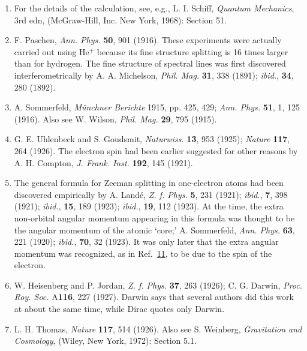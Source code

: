 \begin{enumerate}
\item\label{ref:1.9} For the details of the calculation, see, e.g., L. I. Schiff,
\emph{Quantum Mechanics}, 3rd edn, (McGraw-Hill, Inc. New York, 1968): Section
51.

\item\label{ref:1.10} F. Paschen, \emph{Ann. Phys.} \textbf{50}, 901 (1916). These
experiments were actually carried out using He$^+$ because its fine structure
splitting is 16 times larger than for hydrogen. The fine structure of spectral
lines was first discovered interferometrically by A. A. Michelson, \emph{Phil.
Mag.} \textbf{31}, 338 (1891); \emph{ibid.}, \textbf{34}, 280 (1892).

\item[10a.]\label{ref:1.10a}\label{ref:1.10c} A. Sommerfeld, \emph{M\"unchner Berichte} 1915, pp. 425, 429;
\emph{Ann. Phys.} \textbf{51}, 1, 125 (1916). Also see W. Wilson, \emph{Phil.
Mag.} \textbf{29}, 795 (1915).

\item\label{ref:1.11} G. E. Uhlenbeck and S. Goudsmit, \emph{Naturwiss.} \textbf{13}, 953
(1925); \emph{Nature} \textbf{117}, 264 (1926). The electron spin had been
earlier suggested for other reasons by A. H. Compton, \emph{J. Frank. Inst.}
\textbf{192}, 145 (1921).

\item\label{ref:1.12} The general formula for Zeeman splitting in one-electron atoms had been
discovered empirically by A. Land\'e, \emph{Z. f. Phys.} \textbf{5}, 231
(1921); \emph{ibid.}, \textbf{7}, 398 (1921); \emph{ibid.}, \textbf{15}, 189
(1923); \emph{ibid.}, \textbf{19}, 112 (1923). At the time, the extra
non-orbital angular momentum appearing in this formula was thought to be the
angular momentum of the atomic `core;' A. Sommerfeld, \emph{Ann. Phys.}
\textbf{63}, 221 (1920); \emph{ibid.}, \textbf{70}, 32 (1923). It was only
later that the extra angular momentum was recognized, as in Ref.~\hyperref[ref:1.11]{11}, to be due
to the spin of the electron.

\item\label{ref:1.13} W. Heisenberg and P. Jordan, \emph{Z. f. Phys.} \textbf{37}, 263
(1926); C. G. Darwin, \emph{Proc. Roy. Soc.} A\textbf{116}, 227 (1927).
Darwin says that several authors did this work at about the same time, while
Dirac quotes only Darwin.

\item\label{ref:1.14} L. H. Thomas, \emph{Nature} \textbf{117}, 514 (1926). Also see S.
Weinberg, \emph{Gravitation and Cosmology}, (Wiley, New York, 1972): Section
5.1.


\end{enumerate}
